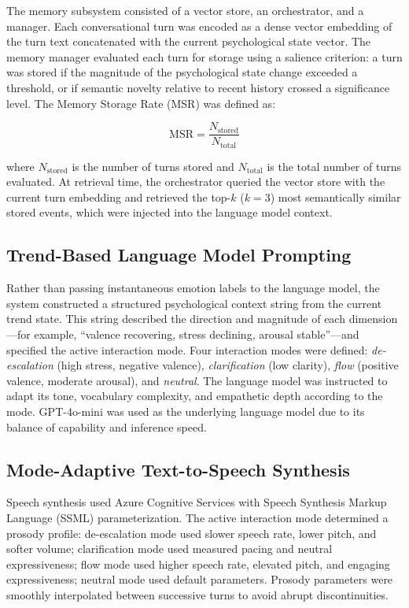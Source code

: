 \documentclass[conference]{IEEEtran}
\begin{document}
The memory subsystem consisted of a vector store, an orchestrator, and a manager. Each conversational turn was encoded as a dense vector embedding of the turn text concatenated with the current psychological state vector. The memory manager evaluated each turn for storage using a salience criterion: a turn was stored if the magnitude of the psychological state change exceeded a threshold, or if semantic novelty relative to recent history crossed a significance level. The Memory Storage Rate (MSR) was defined as:

\begin{equation}
\text{MSR} = \frac{N_{\text{stored}}}{N_{\text{total}}}
\label{eq:msr}
\end{equation}

where $N_{\text{stored}}$ is the number of turns stored and $N_{\text{total}}$ is the total number of turns evaluated. At retrieval time, the orchestrator queried the vector store with the current turn embedding and retrieved the top-$k$ ($k=3$) most semantically similar stored events, which were injected into the language model context.

\subsection{Trend-Based Language Model Prompting}

Rather than passing instantaneous emotion labels to the language model, the system constructed a structured psychological context string from the current trend state. This string described the direction and magnitude of each dimension---for example, ``valence recovering, stress declining, arousal stable''---and specified the active interaction mode. Four interaction modes were defined: \textit{de-escalation} (high stress, negative valence), \textit{clarification} (low clarity), \textit{flow} (positive valence, moderate arousal), and \textit{neutral}. The language model was instructed to adapt its tone, vocabulary complexity, and empathetic depth according to the mode. GPT-4o-mini was used as the underlying language model due to its balance of capability and inference speed.

\subsection{Mode-Adaptive Text-to-Speech Synthesis}

Speech synthesis used Azure Cognitive Services with Speech Synthesis Markup Language (SSML) parameterization. The active interaction mode determined a prosody profile: de-escalation mode used slower speech rate, lower pitch, and softer volume; clarification mode used measured pacing and neutral expressiveness; flow mode used higher speech rate, elevated pitch, and engaging expressiveness; neutral mode used default parameters. Prosody parameters were smoothly interpolated between successive turns to avoid abrupt discontinuities.
\end{document}
